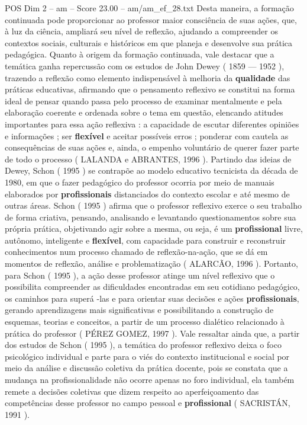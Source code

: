 \begin{textsample}{POS Dim 2 – am – Score 23.00 – am/am\_ef\_28.txt}
Desta maneira, a formação continuada pode proporcionar ao professor maior consciência de suas ações, que, à luz da ciência, ampliará seu nível de reflexão, ajudando a compreender os contextos sociais, culturais e históricos em que planeja e desenvolve sua prática pedagógica.
Quanto à origem da formação continuada, vale destacar que a temática ganha repercussão com os estudos de John Dewey ( 1859 — 1952 ), trazendo a reflexão como elemento indispensável à melhoria da \textbf{qualidade} das práticas educativas, afirmando que o pensamento reflexivo se constitui na forma ideal de pensar quando passa pelo processo de examinar mentalmente e pela elaboração coerente e ordenada sobre o tema em questão, elencando atitudes importantes para essa ação reflexiva : a capacidade de escutar diferentes opiniões e informações ; ser \textbf{flexível} e aceitar possíveis erros ; ponderar com cautela as consequências de suas ações e, ainda, o empenho voluntário de querer fazer parte de todo o processo ( LALANDA e ABRANTES, 1996 ).
Partindo das ideias de Dewey, Schon ( 1995 ) se contrapõe ao modelo educativo tecnicista da década de 1980, em que o fazer pedagógico do professor ocorria por meio de manuais elaborados por \textbf{profissionais} distanciados do contexto escolar e até mesmo de outras áreas.
Schon ( 1995 ) afirma que o professor reflexivo exerce o seu trabalho de forma criativa, pensando, analisando e levantando questionamentos sobre sua própria prática, objetivando agir sobre a mesma, ou seja, é um \textbf{profissional} livre, autônomo, inteligente e \textbf{flexível}, com capacidade para construir e reconstruir conhecimentos num processo chamado de reflexão-na-ação, que se dá em momentos de reflexão, análise e problematização ( ALARCÃO, 1996 ).
Portanto, para Schon ( 1995 ), a ação desse professor atinge um nível reflexivo que o possibilita compreender as dificuldades encontradas em seu cotidiano pedagógico, os caminhos para superá -las e para orientar suas decisões e ações \textbf{profissionais}, gerando aprendizagens mais significativas e possibilitando a construção de esquemas, teorias e conceitos, a partir de um processo dialético relacionado à prática do professor ( PÉREZ GOMEZ, 1997 ).
Vale ressaltar ainda que, a partir dos estudos de Schon ( 1995 ), a temática do professor reflexivo deixa o foco psicológico individual e parte para o viés do contexto institucional e social por meio da análise e discussão coletiva da prática docente, pois se constata que a mudança na profissionalidade não ocorre apenas no foro individual, ela também remete a decisões coletivas que dizem respeito ao aperfeiçoamento das competências desse professor no campo pessoal e \textbf{profissional} ( SACRISTÁN, 1991 ).

\end{textsample}
